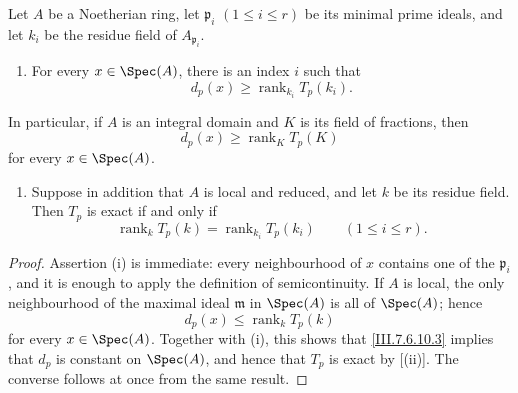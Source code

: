 \begin{corollary}[7.6.10]
\label{III.7.6.10}
Let $A$ be a Noetherian ring, let
$\mathfrak p_i$ $(1\leq i\leq r)$ be its minimal prime
ideals, and let $k_i$ be the residue field of
$A_{\mathfrak p_i}$.
\begin{enumerate}
  \item[(i)] For every $x\in\Spec(A)$, there is an index $i$
    such that
    \[
      d_p(x)\geq
      \operatorname{rank}_{k_i}T_p(k_i).
      \tag{7.6.10.1}\label{III.7.6.10.1}
    \]
\end{enumerate}
In particular, if $A$ is an integral domain and $K$ is its
field of fractions, then
\[
  d_p(x)\geq\operatorname{rank}_K T_p(K)
  \tag{7.6.10.2}\label{III.7.6.10.2}
\]
for every $x\in\Spec(A)$.

\begin{enumerate}
  \item[(ii)] Suppose in addition that $A$ is local and
    reduced, and let $k$ be its residue field.  Then $T_p$ is
    exact if and only if
    \[
      \operatorname{rank}_k T_p(k)
      =
      \operatorname{rank}_{k_i}T_p(k_i)
      \qquad(1\leq i\leq r).
      \tag{7.6.10.3}\label{III.7.6.10.3}
    \]
\end{enumerate}
\end{corollary}

\begin{proof}
Assertion \textnormal{(i)} is immediate: every neighbourhood
of $x$ contains one of the $\mathfrak p_i$, and it is enough
to apply the definition of semicontinuity.  If $A$ is local,
the only neighbourhood of the maximal ideal $\mathfrak m$ in
$\Spec(A)$ is all of $\Spec(A)$; hence
\[
  d_p(x)\leq\operatorname{rank}_k T_p(k)
\]
for every $x\in\Spec(A)$.  Together with \textnormal{(i)},
this shows that \eqref{III.7.6.10.3} implies that $d_p$ is
constant on $\Spec(A)$, and hence that $T_p$ is exact by
[(ii)].  The converse follows at once from
the same result.
\end{proof}

\egaIIISubsectionSevenSixEleven
